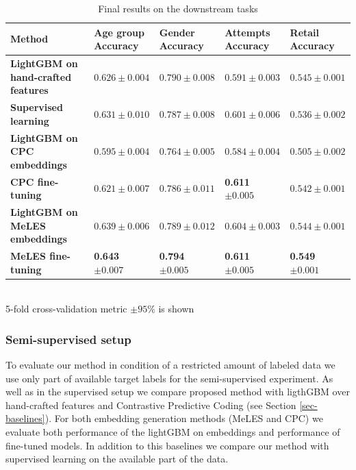 \documentclass{article}
\begin{document}
\begin{table}
\centering
\caption{Final results on the downstream tasks}
\begin{tabular}{lllll}
\toprule
\textbf{Method} & \makecell{\textbf{Age group} \\ \small{Accuracy}} & \makecell{\textbf{Gender} \\ \small{Accuracy}} &  \makecell{\textbf{Attempts} \\ \small{Accuracy}} & \makecell{\textbf{Retail} \\ \small{Accuracy}}\\
\midrule
\textbf{LightGBM on hand-crafted features} & $0.626 \pm 0.004$ & $0.790 \pm 0.008$ & $0.591 \pm 0.003$ & $0.545 \pm 0.001$ \\
\textbf{Supervised learning} & $0.631 \pm 0.010$ & $0.787 \pm 0.008$ & $0.601 \pm 0.006$  & $0.536 \pm 0.002$\\
\midrule
\textbf{LightGBM on CPC embeddings} & $0.595 \pm 0.004$ & $0.764 \pm 0.005$ & $0.584 \pm 0.004$ & $0.505 \pm 0.002$\\
\textbf{CPC fine-tuning} & $0.621 \pm 0.007$ & $0.786 \pm 0.011$ & \textbf{0.611} $\pm 0.005$ & $0.542 \pm 0.001$ \\
\midrule
\textbf{LightGBM on MeLES embeddings} & $0.639 \pm 0.006$ & $0.789 \pm 0.012$ & $0.604 \pm 0.003$ & $0.544 \pm 0.001$ \\
\textbf{MeLES fine-tuning} & \textbf{0.643} $\pm 0.007$ & \textbf{0.794} $\pm 0.005$ & \textbf{0.611} $\pm 0.005$ & \textbf{0.549} $\pm 0.001$ \\
\bottomrule
\end{tabular} \\
\small{5-fold cross-validation metric $\pm 95\%$ is shown}
\label{tab-downstream-res}
\end{table}

\subsubsection{Semi-supervised setup} \label{sec-semi}

To evaluate our method in condition of a restricted amount of labeled data we use only part of available target labels for the semi-supervised experiment.
As well as in the supervised setup we compare proposed method with ligthGBM over hand-crafted features and Contrastive Predictive Coding (see Section \ref{sec-baselines}).
For both embedding generation methods (MeLES and CPC) we evaluate both performance of the lightGBM on embeddings and performance of fine-tuned models.
In addition to this baselines we compare our method with supervised learning on the available part of the data.
\end{document}
